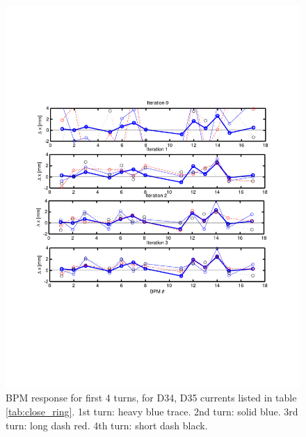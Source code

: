 \begin{figure}[htb]
\centering
\includegraphics[width=\textwidth,trim={.5in 2.7in .5in 2.7in},clip]{3.figures/closing_orbit_BPMs.pdf}
\caption{BPM response for first 4 turns, for D34, D35 currents listed in table \ref{tab:close_ring}. 1st turn: heavy blue trace. 2nd turn: solid blue. 3rd turn: long dash red. 4th turn: short dash black.}
\label{fig:close_BPMs}
\end{figure}

